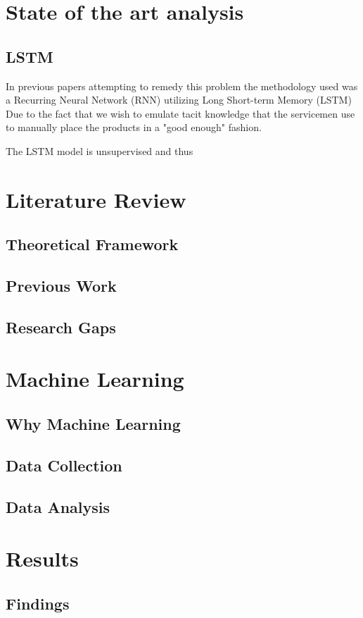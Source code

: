 \documentclass[12pt,a4paper]{report}
\begin{document}
\chapter{State of the art analysis}
\section{LSTM}

In previous papers attempting to remedy this problem the methodology used was a Recurring Neural Network (RNN) utilizing Long Short-term Memory (LSTM) \cite{ref2} Due to the fact that we wish to emulate tacit knowledge that the servicemen use to manually place the products in a "good enough" fashion.

The LSTM model is unsupervised and thus

\chapter{Literature Review}
\section{Theoretical Framework}
\section{Previous Work}
\section{Research Gaps}

\chapter{Machine Learning}
\section{Why Machine Learning}
\section{Data Collection}
\section{Data Analysis}

\chapter{Results}
\section{Findings}
\end{document}
